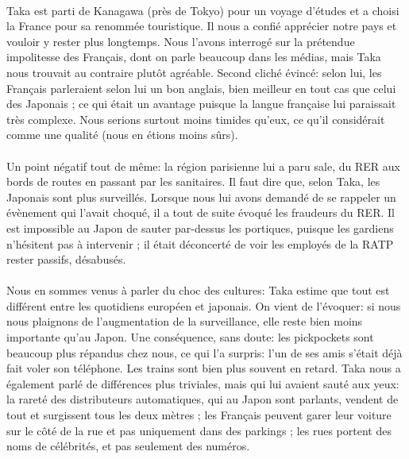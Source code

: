 \paragraph{} Taka est parti de Kanagawa (près de Tokyo) pour un voyage d'études
et a choisi la France pour sa renommée touristique. Il nous a confié apprécier
notre pays et vouloir y rester plus longtemps. Nous l'avons interrogé sur la
prétendue impolitesse des Français, dont on parle beaucoup dans les médias,
mais Taka nous trouvait au contraire plutôt agréable. Second cliché évincé:
selon lui, les Français parleraient selon lui un bon anglais, bien meilleur en
tout cas  que celui des Japonais ; ce qui était un avantage puisque la langue
française lui paraissait très complexe. Nous serions surtout moins timides
qu'eux, ce qu'il considérait comme une qualité (nous en étions moins sûrs).

\paragraph{} Un point négatif tout de même: la région parisienne lui a paru
sale, du RER aux bords de routes en passant par les sanitaires. Il faut dire
que, selon Taka, les Japonais sont plus surveillés. Lorsque nous lui avons
demandé de se rappeler un évènement qui l'avait choqué, il a tout de suite
évoqué les fraudeurs du RER. Il est impossible au Japon de sauter par-dessus
les portiques, puisque les gardiens n'hésitent pas à intervenir ; il était
déconcerté de voir les employés de la RATP rester passifs, désabusés.

\paragraph{} Nous en sommes venus à parler du choc des cultures: Taka estime
que tout est différent entre les quotidiens européen et japonais. On vient de
l'évoquer: si nous nous plaignons de l'augmentation de la surveillance, elle
reste bien moins importante qu'au Japon. Une conséquence, sans doute: les
pickpockets sont beaucoup plus répandus chez nous, ce qui l'a surpris: l'un de
ses amis s'était déjà fait voler son téléphone. Les trains sont bien plus
souvent en retard. Taka nous a également parlé de différences plus triviales,
mais qui lui avaient sauté aux yeux: la rareté des distributeurs automatiques,
qui au Japon sont parlants, vendent de tout et surgissent tous les deux mètres
; les Français peuvent garer leur voiture sur le côté de la rue et pas
uniquement dans des parkings ; les rues portent des noms de célébrités, et pas
seulement des numéros.


